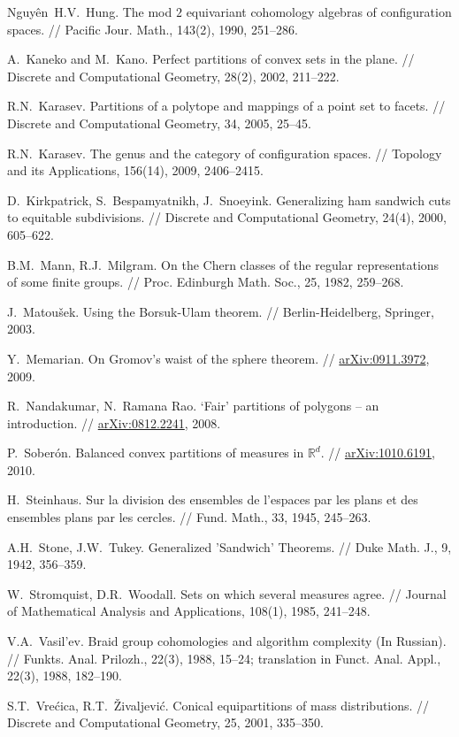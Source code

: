 \documentclass[12pt,a4paper,oneside]{amsart}
\theoremstyle{definition}
\theoremstyle{remark}
\numberwithin{equation}{section}
\begin{document}
\begin{thebibliography}{99}
Nguy\^ en~H.V.~Hung. The mod $2$ equivariant cohomology algebras of configuration spaces. // Pacific Jour. Math., 143(2), 1990, 251--286.

A.~Kaneko and M.~Kano. Perfect partitions of convex sets in the plane. // Discrete and Computational Geometry, 28(2), 2002, 211--222.

R.N.~Karasev. Partitions of a polytope and mappings of a point set to facets. // Discrete and Computational Geometry, 34, 2005, 25--45.

R.N.~Karasev. The genus and the category of configuration spaces. // Topology and its Applications, 156(14), 2009, 2406--2415.

D.~Kirkpatrick, S.~Bespamyatnikh, J.~Snoeyink. Generalizing ham sandwich cuts to equitable subdivisions. // Discrete and Computational Geometry, 24(4), 2000, 605--622.

B.M.~Mann, R.J.~Milgram. On the Chern classes of the regular representations of some finite groups. // Proc. Edinburgh Math. Soc., 25, 1982, 259--268.

J.~Matou\v{s}ek. Using the Borsuk-Ulam theorem. // Berlin-Heidelberg, Springer, 2003.

Y.~Memarian. On Gromov's waist of the sphere theorem. // \href{http://arxiv.org/abs/0911.3972}{arXiv:0911.3972}, 2009.

R.~Nandakumar, N.~Ramana Rao. `Fair' partitions of polygons -- an introduction. // \href{http://arxiv.org/abs/0812.2241}{arXiv:0812.2241}, 2008.

P.~Sober\'on. Balanced convex partitions of measures in $\mathbb{R}^d$. // \href{http://arxiv.org/abs/1010.6191}{arXiv:1010.6191}, 2010.

H.~Steinhaus. Sur la division des ensembles de l'espaces par les plans et des ensembles plans par les cercles. // Fund. Math., 33, 1945, 245--263.

A.H.~Stone, J.W.~Tukey. Generalized 'Sandwich' Theorems. // Duke Math. J., 9, 1942, 356--359.

W.~Stromquist, D.R.~Woodall. Sets on which several measures agree. // Journal of Mathematical Analysis and Applications, 108(1), 1985, 241--248.

V.A.~Vasil'ev. Braid group cohomologies and algorithm complexity (In Russian). // Funkts. Anal. Prilozh., 22(3), 1988, 15--24; translation in Funct. Anal. Appl., 22(3), 1988, 182--190.

S.T.~Vre\'cica, R.T.~\v Zivaljevi\'c. Conical equipartitions of mass distributions. // Discrete and
Computational Geometry, 25, 2001, 335--350.

\end{thebibliography}
\end{document}
